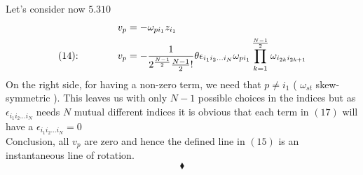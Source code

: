 Let's consider now $\mathbf{5.310}$
\begin{align}
v_p &= -  \omega_{pi_{1}}z_{i_{1}}\\
\text{(14):}\quad\quad\quad\quad v_p &= -\frac{1}{2^{\frac{N-1}{2}}\frac{N-1}{2}!}\theta \epsilon_{i_{1} i_{2} \dots i_{N}}\omega_{pi_{1}}\prod_{k=1}^{\frac{N-1}{2}}\omega_{i_{2k} i_{2k+1}}
\end{align}
On the right side, for having a non-zero term, we need that $p\ne i_{1}$ ( $\omega_{st}$ skew-symmetric ). This leaves us with only $N-1$ possible choices in the indices but as $\epsilon_{i_{1} i_{2} \dots i_{N}}$ needs $N$ mutual different indices it is obvious that each term in $(17)$ will have a $\epsilon_{i_{1} i_{2} \dots i_{N}}= 0$ \\
Conclusion, all $v_p$ are zero and hence the defined line in $(15)$ is an instantaneous line of rotation.
\\
$$\blacklozenge$$
\newpage 



